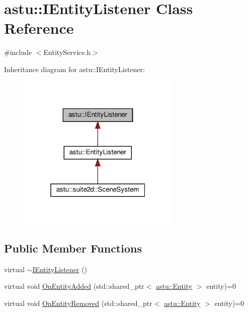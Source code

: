 \hypertarget{classastu_1_1IEntityListener}{}\section{astu\+:\+:I\+Entity\+Listener Class Reference}
\label{classastu_1_1IEntityListener}


{\ttfamily \#include $<$Entity\+Service.\+h$>$}



Inheritance diagram for astu\+:\+:I\+Entity\+Listener\+:\nopagebreak
\begin{figure}[H]
\begin{center}
\leavevmode
\includegraphics[width=220pt]{classastu_1_1IEntityListener__inherit__graph}
\end{center}
\end{figure}
\subsection*{Public Member Functions}
\begin{DoxyCompactItemize}
\item 
virtual \hyperlink{classastu_1_1IEntityListener_ad3e01cd267ff128c2176d06897c8c7b6}{$\sim$\+I\+Entity\+Listener} ()
\item 
virtual void \hyperlink{classastu_1_1IEntityListener_afa087302fdf0bd999297b0d35ceb1f61}{On\+Entity\+Added} (std\+::shared\+\_\+ptr$<$ \hyperlink{classastu_1_1Entity}{astu\+::\+Entity} $>$ entity)=0
\item 
virtual void \hyperlink{classastu_1_1IEntityListener_ab3d5a276da5e42cc4831e747fdf11718}{On\+Entity\+Removed} (std\+::shared\+\_\+ptr$<$ \hyperlink{classastu_1_1Entity}{astu\+::\+Entity} $>$ entity)=0
\end{DoxyCompactItemize}


